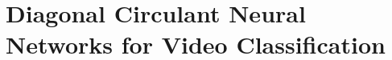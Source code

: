 \chapter{Diagonal Circulant Neural Networks for Video Classification}
\label{chapter:diagonal_circulant_neural_networks_for_video_classification}
\localtableofcontents


%
%
%
